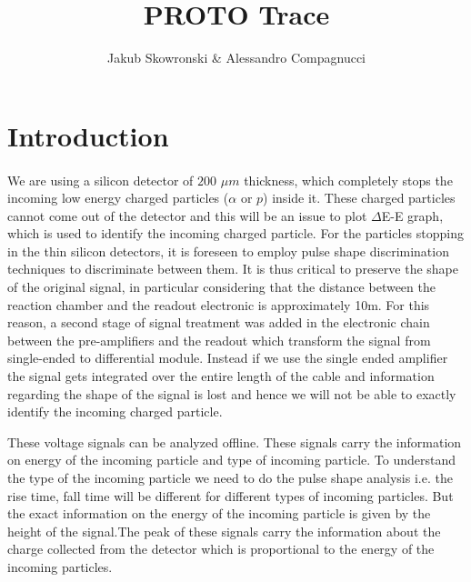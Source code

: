 \documentclass[a4paper, 11pt]{article}
\author{Jakub Skowronski & Alessandro Compagnucci}
\title{PROTO Trace}
\begin{document}
\maketitle

\section{Introduction}
 \paragraph{}
 
We are using a silicon detector of $200$ $\mu$$m$ thickness, which completely stops the incoming low energy charged particles ($\alpha$ or $p$) inside it. These charged particles cannot come out of the detector and this will be an issue to plot $\Delta$E-E graph, which is used to identify the incoming charged particle. For the particles stopping in the thin silicon detectors, it is foreseen to employ pulse shape discrimination techniques to discriminate between them. It is thus critical to preserve the shape of the original signal, in particular considering that the distance between the reaction chamber and the readout electronic is approximately 10m. For this reason, a second stage of signal treatment was added in the electronic chain between the pre-amplifiers and the readout which transform the signal from single-ended to differential module. Instead if we use the single ended amplifier the signal gets integrated over the entire length of the cable and information regarding the shape of the signal is lost and hence we will not be able to exactly identify the incoming charged particle.
         
These voltage signals can be analyzed offline. These signals carry the information on energy of the incoming particle and type of incoming particle.  To understand the type of the incoming particle we need to do the pulse shape analysis i.e. the rise time, fall time will be different for different types of incoming particles. But the exact information on the energy of the incoming particle is given by the height of the signal.The peak of these signals carry the information about the charge collected from the detector which is proportional to the energy of the incoming particles.
 
\end{document}
